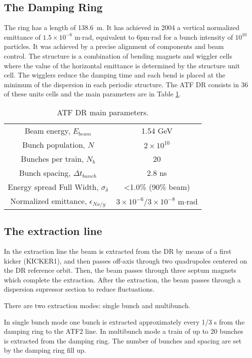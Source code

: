 \subsection{The Damping Ring}
The ring has a length of 138.6~m. It has achieved in 2004 a vertical normalized emittance of $1.5\times10^{-8}$ m$\cdot$rad, equivalent to $6$pm$\cdot$rad for a bunch intensity of $10^{10}$ particles. It was achieved by a precise alignment of components and beam control. The structure is a combination of bending magnets and wiggler cells where the value of the horizontal emittance is determined by the structure unit cell. The wigglers reduce the damping time and each bend is placed at the minimum of the dispersion in each periodic structure. The ATF DR consists in 36 of these units cells and the main parameters are in Table \ref{t:ATFDR}.
\begin{table}[hbt]
\centering
 \begin{tabular}{|c|c|}\hline
 Beam energy, $E_{beam}$& 1.54 GeV \\
 Bunch population, $N$& $2\times10^{10}$ \\
 Bunches per train, $N_b$ & 20 \\
 Bunch spacing, $\Delta t_{bunch}$ & 2.8 ns\\
 Energy spread Full Width, $\sigma_\delta$ & <1.0\% (90\% beam)\\
 Normalized emittance, $\epsilon_{Nx/y}$ & $3\times 10^{-6}/3\times 10^{-8}$ m$\cdot$rad\\\hline 
 \end{tabular}\caption{ATF DR main parameters.}\label{t:ATFDR}
\end{table}
\subsection{The extraction line}
In the extraction line the beam is extracted from the DR by means of a first kicker (KICKER1), and then passes off-axis through two quadrupoles centered on the DR reference orbit. Then, the beam passes through three septum magnets which complete the extraction. After the extraction, the beam passes through a dispersion supressor section to reduce fluctuations.\par
There are two extraction modes: single bunch and multibunch.\par
In single bunch mode one bunch is extracted approximately every 1/3 s from the damping ring to the ATF2 line. In multibunch mode a train of up to 20 bunches is extracted from the damping ring. The number of bunches and spacing are set by the damping ring fill up.\par
